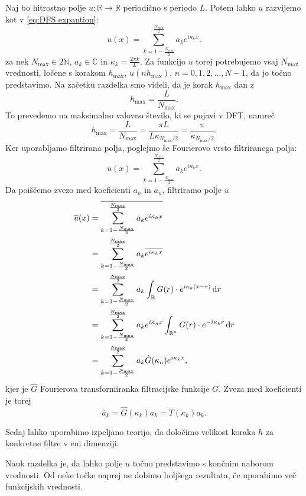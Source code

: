 \documentclass[mat2, tisk]{fmfdelo}
\newcommand{\R}{\mathbb R}
\newcommand{\N}{\mathbb N}
\newcommand{\C}{\mathbb C}
\begin{document}
\noindent
Naj bo hitrostno polje $u: \R \rightarrow \R$ periodično s periodo $L$.
Potem lahko $u$ razvijemo kot v \eqref{eq:DFS expantion}:
$$
u(x) = \sum_{k=1-\frac{N_{\text{max}}}{2}}^{\frac{N_\text{max}}{2}} a_k e^{i\kappa_k x}.
$$
za nek $N_\text{max} \in 2\N$, $a_k \in \C$ in $\kappa_k = \frac{2\pi k}{L}$. 
Za funkcijo $u$ torej potrebujemo vsaj $N_{\text{max}}$ vrednosti, ločene s korakom $h_{\text{max}}$,
$u(n h_{\text{max}})$, $n = 0, 1, 2, \dots, N - 1$, da jo točno predstavimo.
Na začetku razdelka smo videli, da je korak $h_\text{max}$ dan z 
$$
h_\text{max} = \frac{L}{N_\text{max}}.
$$
To prevedemo na maksimalno valovno število, ki se pojavi v 
DFT, namreč
$$
h_\text{max} = \frac{L}{N_\text{max}} = \frac{\pi L}{L \kappa_{{N_\text{max}/2}}} = \frac{\pi}{\kappa_{N_\text{max}/2}}.
$$
\noindent
Ker uporabljamo filtrirana polja, poglejmo še Fourierovo vrsto filtriranega polja:
\begin{equation}
\label{eq:filterDFT}
\overline{u}(x) = \sum_{k=1-\frac{N_{\text{max}}}{2}}^{\frac{N_\text{max}}{2}} \overline{a}_k e^{i\kappa_k x}.
\end{equation}
Da poiščemo zvezo med koeficienti $a_n$ in $\overline{a}_n$, filtriramo polje $u$
\begin{align*}
\overline{u}(x) &= \overline{\sum_{k=1-\frac{N_{\text{max}}}{2}}^{\frac{N_\text{max}}{2}} a_k e^{i\kappa_k x}} \\
&= \sum_{k=1-\frac{N_{\text{max}}}{2}}^{\frac{N_\text{max}}{2}} a_k \overline{e^{i\kappa_k x}} \\ 
&= \sum_{k=1-\frac{N_{\text{max}}}{2}}^{\frac{N_\text{max}}{2}} a_k \int_{\R} G(r)\cdot e^{i\kappa_k(x - r)} \dif r \\
&= \sum_{k=1-\frac{N_{\text{max}}}{2}}^{\frac{N_\text{max}}{2}} a_k e^{i\kappa_n x }\int_{\R^n} G(r)\cdot e^{-i\kappa_k r} \dif r\\
&= \sum_{k=1-\frac{N_{\text{max}}}{2}}^{\frac{N_\text{max}}{2}} a_k \hat{G}(\kappa_n) e^{i\kappa_k x},
\end{align*}
kjer je $\hat{G}$ Fourierova transformiranka filtracijske funkcije $G$. Zveza med koeficienti je torej 
\begin{equation}
  \label{koef_filter}
\overline{a}_k = \hat{G}(\kappa_k) a_k = T(\kappa_k) a_k.
\end{equation}

Sedaj lahko uporabimo izpeljano teorijo, da določimo velikost koraka $h$ 
za konkretne filtre v eni dimenziji. 

\begin{opomba}
Nauk razdelka je, da lahko polje $u$ točno predstavimo s končnim naborom 
vrednosti. Od neke točke naprej ne dobimo boljšega rezultata, če 
uporabimo več funkcijskih vrednosti.
\end{opomba}
\end{document}
